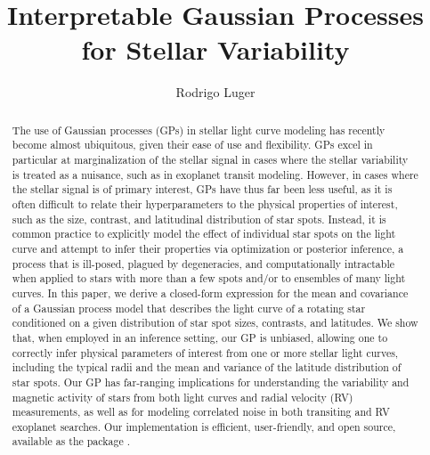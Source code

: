 \documentclass[modern]{aastex62}
\begin{document}
\title{%
    \textbf{
        Interpretable Gaussian Processes for Stellar Variability
    }
}

\author[0000-0002-0296-3826]{Rodrigo Luger}
%



\begin{abstract}
    The use of Gaussian processes (GPs) in stellar light curve modeling has recently
    become almost ubiquitous, given their ease of use and flexibility.
    GPs excel in particular at marginalization
    of the stellar signal in cases where the stellar variability is treated
    as a nuisance, such as in exoplanet transit modeling.
    However, in cases where the stellar signal is of primary interest,
    GPs have thus far been less useful, as it is often difficult to
    relate their hyperparameters to the physical properties of interest, such
    as the size, contrast, and latitudinal distribution of star spots.
    Instead, it is common practice to explicitly model the effect
    of individual star spots on the light curve and attempt to infer their
    properties via optimization or posterior inference, a process that is
    ill-posed, plagued by degeneracies, and computationally intractable when
    applied to stars with more than a few spots and/or to ensembles of many
    light curves.
    In this paper, we derive a closed-form expression for the
    mean and covariance of a Gaussian process model that describes
    the light curve of a rotating star conditioned on a given distribution of
    star spot sizes, contrasts, and latitudes.
    We show that, when employed in an inference setting, our GP is unbiased,
    allowing one to correctly infer physical parameters of interest from one
    or more stellar light curves, including
    the typical radii and the mean and variance of the latitude
    distribution of star spots.
    Our GP has far-ranging implications for understanding the variability and
    magnetic activity of stars from both light curves and radial velocity (RV)
    measurements, as well as for modeling correlated noise in both transiting
    and RV exoplanet searches.
    Our implementation is efficient, user-friendly, and open source, available
    as the \Python package \starryprocess.
    \href{https://github.com/rodluger/starry_process}{\color{linkcolor}\faGithub}
\end{abstract}
\end{document}
